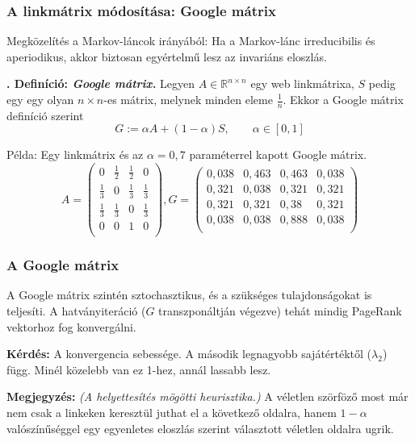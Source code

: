 \documentclass[]{beamer}
\newcounter{definicioszam}
\newenvironment{definicio}[1]
{{\medskip}\noindent \stepcounter{definicioszam}
{\bfseries{\thedefinicioszam. Definíció: \textit{#1.}}}}{\bigskip }
\begin{document}
\begin{frame}
	\frametitle{A linkmátrix módosítása: Google mátrix}
	
	Megközelítés a Markov-láncok irányából: Ha a Markov-lánc irreducibilis és aperiodikus, akkor biztosan egyértelmű lesz az invariáns eloszlás.
	
	\begin{definicio}{Google mátrix}
		Legyen $A \in \mathbb{R}^{n \times n}$ egy web linkmátrixa, $S$ pedig egy egy olyan $n \times n$-es mátrix, melynek minden eleme $\frac{1}{n}$. Ekkor a Google mátrix definíció szerint
		\[ G := \alpha A + (1-\alpha) S, \qquad \alpha \in [0,1] \]
	\end{definicio}

\vspace{-0.8cm}
Példa: Egy linkmátrix és az $\alpha = 0,7$ paraméterrel kapott Google mátrix.
\[A =
\begin{pmatrix}
0 & \frac{1}{2} & \frac{1}{2} & 0 \\
\frac{1}{3} & 0 & \frac{1}{3} & \frac{1}{3} \\
\frac{1}{3} & \frac{1}{3} & 0 & \frac{1}{3} \\
0 & 0 & 1 & 0 \\
\end{pmatrix},
G = 
\begin{pmatrix}
0,\!038 & 0,\!463 & 0,\!463 & 0,\!038 \\
0,\!321 & 0,\!038 & 0,\!321 & 0,\!321 \\
0,\!321 & 0,\!321 & 0,\!38 & 0,\!321 \\
0,\!038 & 0,\!038 & 0,\!888 & 0,\!038 \\
\end{pmatrix}
\]
\end{frame}

\begin{frame}
	\frametitle{A Google mátrix}
	
	A Google mátrix szintén sztochasztikus, és a szükséges tulajdonságokat is teljesíti. A hatványiteráció ($G$ transzponáltján végezve) tehát mindig PageRank vektorhoz fog konvergálni.
	
	\bigskip
	
	\textbf{Kérdés:} A konvergencia sebessége. A második legnagyobb sajátértéktől ($\lambda_2$) függ. Minél közelebb van ez 1-hez, annál lassabb lesz.
	
	\bigskip
	
	\textbf{Megjegyzés:} \textit{(A helyettesítés mögötti heurisztika.)} \newline
	A véletlen szörföző most már nem csak a linkeken keresztül juthat el a következő oldalra, hanem $1-\alpha$ valószínűséggel egy egyenletes eloszlás szerint választott véletlen oldalra ugrik.
\end{frame}
\end{document}
